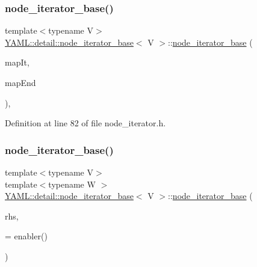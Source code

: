 \subsubsection{\texorpdfstring{node\_iterator\_base()}{node\_iterator\_base()}\hspace{0.1cm}{\footnotesize\ttfamily [3/4]}}
{\footnotesize\ttfamily template$<$typename V$>$ \\
\mbox{\hyperlink{class_y_a_m_l_1_1detail_1_1node__iterator__base}{Y\+A\+M\+L\+::detail\+::node\+\_\+iterator\+\_\+base}}$<$ V $>$\+::\mbox{\hyperlink{class_y_a_m_l_1_1detail_1_1node__iterator__base}{node\+\_\+iterator\+\_\+base}} (\begin{DoxyParamCaption}\item[{\mbox{\hyperlink{class_y_a_m_l_1_1detail_1_1node__iterator__base_aaa2316d6fa0080ad766fc2429f7a68ed}{Map\+Iter}}}]{map\+It,  }\item[{\mbox{\hyperlink{class_y_a_m_l_1_1detail_1_1node__iterator__base_aaa2316d6fa0080ad766fc2429f7a68ed}{Map\+Iter}}}]{map\+End }\end{DoxyParamCaption})\hspace{0.3cm}{\ttfamily [inline]}, {\ttfamily [explicit]}}



Definition at line 82 of file node\+\_\+iterator.\+h.

\mbox{\label{class_y_a_m_l_1_1detail_1_1node__iterator__base_a4b0fffffde84d495e328bb55b51d547b}} 
\subsubsection{\texorpdfstring{node\_iterator\_base()}{node\_iterator\_base()}\hspace{0.1cm}{\footnotesize\ttfamily [4/4]}}
{\footnotesize\ttfamily template$<$typename V$>$ \\
template$<$typename W $>$ \\
\mbox{\hyperlink{class_y_a_m_l_1_1detail_1_1node__iterator__base}{Y\+A\+M\+L\+::detail\+::node\+\_\+iterator\+\_\+base}}$<$ V $>$\+::\mbox{\hyperlink{class_y_a_m_l_1_1detail_1_1node__iterator__base}{node\+\_\+iterator\+\_\+base}} (\begin{DoxyParamCaption}\item[{const \mbox{\hyperlink{class_y_a_m_l_1_1detail_1_1node__iterator__base}{node\+\_\+iterator\+\_\+base}}$<$ W $>$ \&}]{rhs,  }\item[{typename std\+::enable\+\_\+if$<$ std\+::is\+\_\+convertible$<$ W $\ast$, V $\ast$ $>$\+::\mbox{\hyperlink{glad_8h_a03aff08f73d7fde3d1a08e0abd8e84fa}{value}}, enabler $>$\+::\mbox{\hyperlink{glad_8h_a890efa53b3d7deeeced6f3a0d6653ed3}{type}}}]{ = {\ttfamily enabler()} }\end{DoxyParamCaption})\hspace{0.3cm}{\ttfamily [inline]}}



